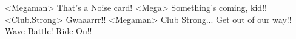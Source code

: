 <Megaman> That's a Noise card! 
<Mega> Something's coming, kid!! 
<Club.Strong> Gwaaarrr!! 
<Megaman> Club Strong... Get out of our way!! 
Wave Battle! Ride On!! 
